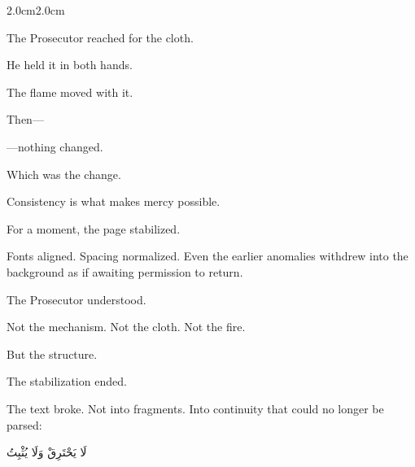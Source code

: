 \begin{adjustwidth}{2.0cm}{2.0cm}
\medskip

The Prosecutor reached for the cloth.

\medskip

He held it in both hands.

\medskip

The flame moved with it.

\medskip

Then---

\medskip

---nothing changed.

\medskip

Which was the change.

\medskip

\begin{center}
Consistency is what makes mercy possible.
\end{center}

\medskip

For a moment, the page stabilized.

Fonts aligned. Spacing normalized. Even the earlier anomalies withdrew into the
background as if awaiting permission to return.

The Prosecutor understood.

Not the mechanism. Not the cloth. Not the fire.

But the structure.

\medskip


\medskip

The stabilization ended.

\medskip


\medskip


\medskip

The text broke. Not into fragments. Into continuity that could no longer be parsed:

\medskip


\medskip

\begin{AR}
لَا يَحْتَرِقْ وَلَا يُثْبِتُ
\end{AR}


\end{adjustwidth}
